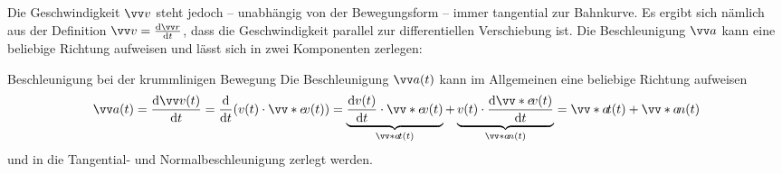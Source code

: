 Die Geschwindigkeit $\ivec{v}$ steht jedoch -- unabhängig von der Bewegungsform -- immer tangential zur Bahnkurve. Es ergibt sich nämlich aus der Definition $\ivec{v} = \frac{\dd \ivec{r}}{\dd t}$, dass die Geschwindigkeit parallel zur differentiellen Verschiebung ist. Die Beschleunigung $\ivec{a}$ kann eine beliebige Richtung aufweisen und lässt sich in zwei Komponenten zerlegen: 

\begin{importantbox}{Beschleunigung bei der krummlinigen Bewegung}
Die Beschleunigung $\ivec{a}(t)$ kann im Allgemeinen eine beliebige Richtung aufweisen
    \begin{equation}
        \ivec{a}(t) = \frac{\dd \ivec{v}(t)}{\dd t} = \frac{\dd}{\dd t}(v(t) \cdot \ivecS{e}{v}(t)) = \underbrace{\frac{\dd v(t)}{\dd t} \cdot \ivecS{e}{v}(t)}_{\ivecS{a}{t}(t)} + \underbrace{v(t) \cdot \frac{\dd \ivecS{e}{v}(t)}{\dd t}}_{\ivecS{a}{n}(t)} = \ivecS{a}{t}(t) + \ivecS{a}{n}(t)
    \end{equation}
und in die Tangential- und Normalbeschleunigung zerlegt werden.
\end{importantbox}
